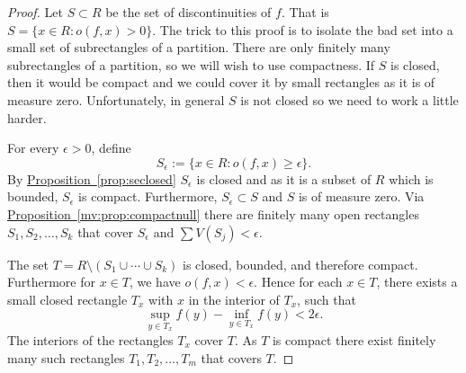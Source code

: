 \documentclass[12pt]{book}
\theoremstyle{plain}
\theoremstyle{remark}
\theoremstyle{definition}
\theoremstyle{exercise}
\theoremstyle{example}
\newcommand{\propref}[1]{\hyperref[#1]{Proposition~\ref*{#1}}}
\begin{document}
\begin{proof}
Let $S \subset R$ be the set of discontinuities of $f$.  That is
$S = \{ x \in R : o(f,x) > 0 \}$.  The trick to this proof is to isolate the
bad set into a small set of subrectangles of a partition.  There are only
finitely many subrectangles of a partition, so we will wish to use
compactness.  If $S$ is closed, then it would be compact and we could cover
it by small rectangles as it is of measure zero.  Unfortunately, in general $S$
is not closed so we need to work a little harder.

For every $\epsilon > 0$, define
\begin{equation*}
S_\epsilon := \{ x \in R : o(f,x) \geq \epsilon \} .
\end{equation*}
By \propref{prop:seclosed} $S_\epsilon$ is closed and as it is a subset of $R$
which is bounded, $S_\epsilon$ is compact.  Furthermore,
$S_\epsilon \subset S$ and $S$ is of measure zero.
Via \propref{mv:prop:compactnull} there are finitely many open rectangles
$S_1,S_2,\ldots,S_k$ that cover $S_\epsilon$ and
$\sum V(S_j) < \epsilon$.  

The set $T = R \setminus ( S_1 \cup \cdots \cup S_k )$ is closed, bounded,
and therefore compact.  Furthermore for $x \in T$, we have $o(f,x) <
\epsilon$.  Hence for each $x \in T$, there exists a small closed rectangle
$T_x$ with $x$ in the interior of $T_x$, such that
\begin{equation*}
\sup_{y\in T_x} f(y) - \inf_{y\in T_x} f(y) < 2\epsilon.
\end{equation*}
The interiors of the rectangles $T_x$ cover $T$.  As $T$ is compact
there exist finitely many such rectangles $T_1, T_2, \ldots, T_m$
that covers $T$.


\end{proof}
\end{document}
